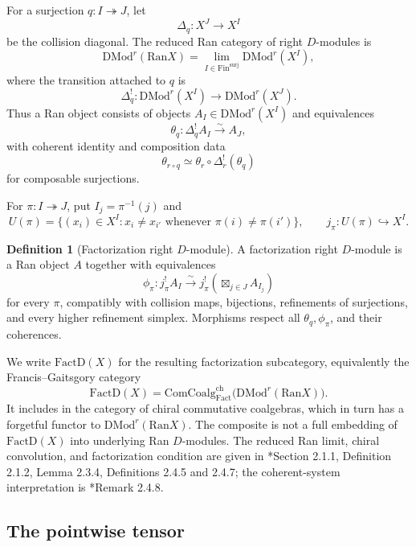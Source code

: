 \documentclass[11pt,reqno]{amsart}
\theoremstyle{definition}
\newtheorem{definition}[theorem]{Definition}
\theoremstyle{remark}
\providecommand{\Ran}{\mathrm{Ran}}
\providecommand{\FactD}{\mathrm{FactD}}
\providecommand{\DMod}{\mathrm{DMod}}
\providecommand{\ComCoalg}{\mathrm{ComCoalg}}
\providecommand{\Fin}{\mathrm{Fin}}
\begin{document}
For a surjection \(q:I\twoheadrightarrow J\), let
\[
 \Delta_q:X^J\longrightarrow X^I
\]
be the collision diagonal.  The reduced Ran category of right
\(D\)-modules is
\[
 \DMod^r(\Ran X)
 =\lim_{I\in\Fin^{\mathrm{surj}}}\DMod^r(X^I),
\]
where the transition attached to \(q\) is
\[
 \Delta_q^!:\DMod^r(X^I)\longrightarrow\DMod^r(X^J).
\]
Thus a Ran object consists of objects \(A_I\in\DMod^r(X^I)\) and
equivalences
\[
 \theta_q:\Delta_q^!A_I\xrightarrow{\sim}A_J,
\]
with coherent identity and composition data
\[
 \theta_{r\circ q}\simeq
 \theta_r\circ\Delta_r^!(\theta_q)
\]
for composable surjections.

For \(\pi:I\twoheadrightarrow J\), put \(I_j=\pi^{-1}(j)\) and
\[
 U(\pi)=
 \{(x_i)\in X^I:x_i\ne x_{i'}
       \text{ whenever }\pi(i)\ne\pi(i')\},
 \qquad
 j_\pi:U(\pi)\hookrightarrow X^I.
\]

\begin{definition}[Factorization right \(D\)-module]
\label{def:factorization}
A factorization right \(D\)-module is a Ran object \(A\) together with
equivalences
\[
 \phi_\pi:
 j_\pi^!A_I\xrightarrow{\sim}
 j_\pi^!\left(\boxtimes_{j\in J}A_{I_j}\right)
\]
for every \(\pi\), compatibly with collision maps, bijections,
refinements of surjections, and every higher refinement simplex.
Morphisms respect all \(\theta_q,\phi_\pi\), and their coherences.
\end{definition}

We write \(\FactD(X)\) for the resulting factorization subcategory,
equivalently the Francis--Gaitsgory category
\[
 \FactD(X)
 =
 \ComCoalg^{\mathrm{ch}}_{\mathrm{Fact}}
   \bigl(\DMod^r(\Ran X)\bigr).
\]
It includes in the category of chiral commutative coalgebras, which in
turn has a forgetful functor to \(\DMod^r(\Ran X)\).  The composite is
not a full embedding of \(\FactD(X)\) into underlying Ran
\(D\)-modules.  The reduced Ran limit,
chiral convolution, and factorization condition are given in
\cite{FG12}*{Section 2.1.1, Definition 2.1.2, Lemma 2.3.4,
Definitions 2.4.5 and
2.4.7}; the coherent-system interpretation is
\cite{FG12}*{Remark 2.4.8}.

\subsection{The pointwise tensor}
\end{document}
